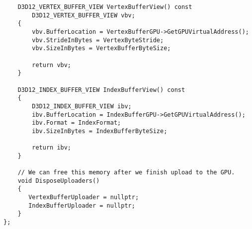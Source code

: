 \begin{flushleft}
\begin{lstlisting}
    D3D12_VERTEX_BUFFER_VIEW VertexBufferView() const
        D3D12_VERTEX_BUFFER_VIEW vbv;
    {
        vbv.BufferLocation = VertexBufferGPU->GetGPUVirtualAddress();
        vbv.StrideInBytes = VertexByteStride;
        vbv.SizeInBytes = VertexBufferByteSize;

        return vbv;
    }
    
    D3D12_INDEX_BUFFER_VIEW IndexBufferView() const
    {
        D3D12_INDEX_BUFFER_VIEW ibv;
        ibv.BufferLocation = IndexBufferGPU->GetGPUVirtualAddress();
        ibv.Format = IndexFormat;
        ibv.SizeInBytes = IndexBufferByteSize;

        return ibv;
    }
    
    // We can free this memory after we finish upload to the GPU.
    void DisposeUploaders()
    {
       VertexBufferUploader = nullptr;
       IndexBufferUploader = nullptr;
    }
};
\end{lstlisting}
\end{flushleft}

